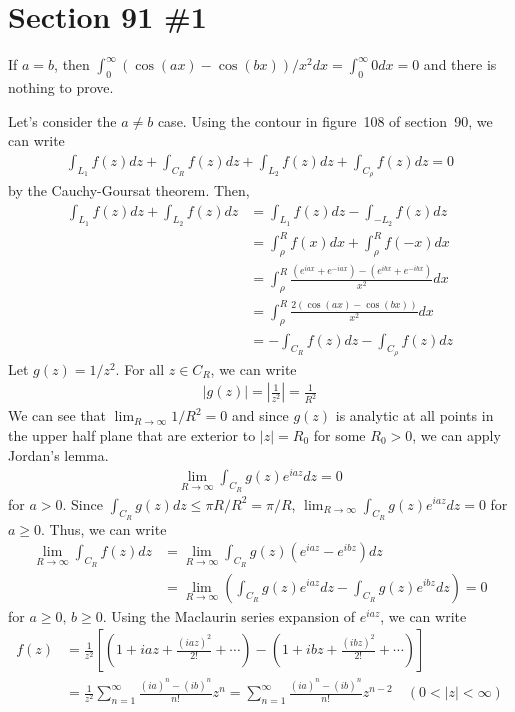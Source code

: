 \documentclass{scrartcl}
\begin{document}
\section{Section 91 \#1}
If \(a = b\), then \(\int^\infty_0 (\cos (ax) - \cos (bx)) / x^2 dx = \int^\infty_0 0 dx = 0\) and there is nothing to prove.

Let's consider the \(a \not = b\) case.
Using the contour in figure~108 of section~90, we can write
\begin{align*}
  \int_{L_1} f(z) dz + \int_{C_R} f(z) dz + \int_{L_2} f(z) dz + \int_{C_\rho} f(z) dz = 0
\end{align*}
by the Cauchy-Goursat theorem.
Then,
\begin{align}
  \nonumber \int_{L_1} f(z) dz + \int_{L_2} f(z) dz
  &= \int_{L_1} f(z) dz - \int_{-L_2} f(z) dz \\
  \nonumber &= \int^R_\rho f(x) dx + \int^R_\rho f(-x) dx \\
  \nonumber &= \int^R_\rho \frac{(e^{iax} + e^{-iax}) - (e^{ibx} + e^{-ibx})}{x^2} dx \\
  \nonumber &= \int^R_\rho \frac{2(\cos (ax) - \cos (bx))}{x^2} dx \\
  \label{sec4_eq} &= -\int_{C_R} f(z) dz - \int_{C_\rho} f(z) dz
\end{align}
Let \(g(z) = 1 / z^2\).
For all \(z \in C_R\), we can write
\begin{align*}
  |g(z)| = \left| \frac{1}{z^2} \right| = \frac{1}{R^2}
\end{align*}
We can see that \(\lim_{R \to \infty} 1 / R^2 = 0\) and since \(g(z)\) is analytic at all points in the upper half plane that are exterior to \(|z| = R_0\) for some \(R_0 > 0\), we can apply Jordan's lemma.
\begin{align*}
  \lim_{R \to \infty} \int_{C_R} g(z) e^{iaz} dz = 0
\end{align*}
for \(a > 0\).
Since \(\int_{C_R} g(z) dz \leq \pi R / R^2 = \pi / R\), \(\lim_{R \to \infty} \int_{C_R} g(z) e^{iaz} dz = 0\) for \(a \geq 0\).
Thus, we can write
\begin{align*}
  \lim_{R \to \infty} \int_{C_R} f(z) dz
  &= \lim_{R \to \infty} \int_{C_R} g(z) (e^{iaz} - e^{ibz}) dz \\
  &= \lim_{R \to \infty} \left( \int_{C_R} g(z) e^{iaz} dz - \int_{C_R} g(z) e^{ibz} dz \right)
  = 0
\end{align*}
for \(a \geq 0,\, b \geq 0\).
Using the Maclaurin series expansion of \(e^{iaz}\), we can write
\begin{align*}
  f(z)
  &= \frac{1}{z^2} \left[ \left( 1 + iaz + \frac{(iaz)^2}{2!} + \cdots \right) - \left( 1 + ibz + \frac{(ibz)^2}{2!} + \cdots \right) \right] \\
  &= \frac{1}{z^2} \sum^\infty_{n = 1} \frac{(ia)^n - (ib)^n}{n!} z^n
  = \sum^\infty_{n = 1} \frac{(ia)^n - (ib)^n}{n!} z^{n - 2} \quad (0 < |z| < \infty)
\end{align*}
\end{document}
